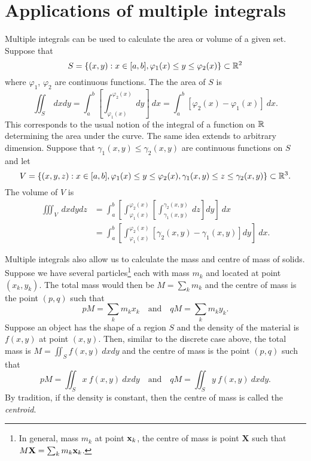 \section{Applications of multiple integrals}

Multiple integrals can be used to calculate the area or volume of a given set.
Suppose that
\[
    S = \left\{(x,y): x \in [a,b], \varphi_1(x) \leq y \leq \varphi_2(x)\right\}  \subset \mathbb{R}^2
\]
where \(\varphi_1\), \(\varphi_2\) are continuous functions.
The the area of \(S\) is
\[
    \iint_{S} \ dx dy = \int_{a}^{b} \left[ \int_{\varphi_1(x)}^{\varphi_2(x)} \ dy\right] \ dx
    = \int_{a}^{b} [ \varphi_2(x) - \varphi_1(x) ] \ dx.
\]
This corresponds to the usual notion of the integral of a function on \(\mathbb{R}\) determining the area under the curve.
The same idea extends to arbitrary dimension.
Suppose that \(\gamma_1(x,y) \leq \gamma_2(x,y)\) are continuous functions on \(S\) and let
\[
    V = \left\{ (x,y,z) :  x \in [a,b], \varphi_1(x) \leq y \leq \varphi_2(x), \gamma_1(x,y) \leq z \leq \gamma_2(x,y)  \right\} \subset \mathbb{R}^3.
\]
The volume of \(V\) is
\[
    \begin{aligned}
        \iiint_{V} \ dx dy dz
         & =  \int_{a}^{b}
        \left[ \int_{\varphi_1(x)}^{\varphi_2(x)}  \left[ \int_{ \gamma_1(x,y)}^{ \gamma_2(x,y)} \ dz \right] dy \right] \ dx \\
         & =  \int_{a}^{b}
        \left[ \int_{\varphi_1(x)}^{\varphi_2(x)}   [  \gamma_2(x,y)  -   \gamma_1(x,y) ] dy \right] \ dx.
    \end{aligned}
\]


Multiple integrals also allow us to calculate the mass and centre of mass of solids.
Suppose we have several particles\footnote{In general, mass \(m_k\) at point \(\mathbf{x}_k\), the centre of mass is point \(\mathbf{X}\) such that \( M\mathbf{X} = \sum_{k} m_k \mathbf{x}_k\).} each with mass \(m_k\) and located at point \((x_k,y_k)\).
The total mass would then be \(M = \sum_{k} m_k\)
and the centre of mass is the point \((p,q)\) such that
\[
    p M = \sum_{k} m_k x_k
    \quad \text{and} \quad
    q M = \sum_{k} m_k y_k.
\]
Suppose an object has the shape of a region \(S\) and the density of the material is \(f(x,y)\) at point \((x,y)\).
Then, similar to the discrete case above,
the total mass is \(M = \iint_{S} f(x,y) \ dx dy\)
and the centre of mass is the point \((p,q)\) such that
\[
    p M = \iint_{S} x \ f(x,y) \ dx dy
    \quad \text{and} \quad
    q M = \iint_{S} y \ f(x,y) \ dx dy.
\]
By tradition, if the density is constant, then the centre of mass is called the \emph{centroid}.


